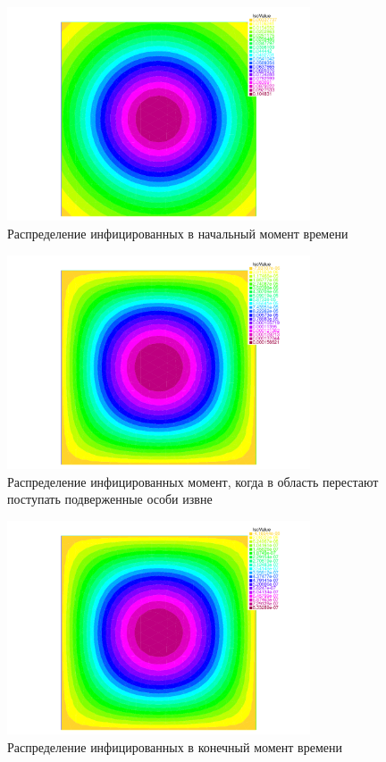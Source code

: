 \begin{figure}[H]
	\centering
	\includegraphics[width=0.8\textwidth]{additional/fem/initial.pdf}
	\caption{Распределение инфицированных в начальный момент времени}
\end{figure}

\begin{figure}[H]
	\centering
	\includegraphics[width=0.8\textwidth]{additional/fem/middle.pdf}
	\caption{Распределение инфицированных момент, когда в область перестают поступать подверженные особи извне}
\end{figure}

\begin{figure}[H]
	\centering
	\includegraphics[width=0.8\textwidth]{additional/fem/last.pdf}
	\caption{Распределение инфицированных в конечный момент времени}
\end{figure}